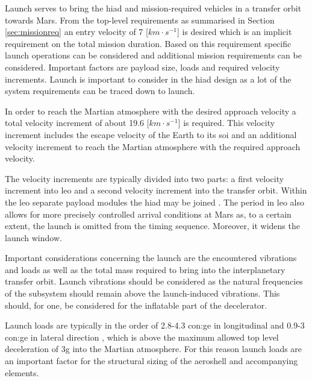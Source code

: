 Launch serves to bring the \gls{hiad} and mission-required vehicles in a transfer orbit towards Mars. From the top-level requirements as summarised in Section \ref{sec:missionreq} an entry velocity of 7 [$km\cdot s^{-1}$] is desired which is an implicit requirement on the total mission duration.
Based on this requirement specific launch operations can be considered and additional mission requirements can be considered. Important factors are payload size, loads and required velocity increments. Launch is important to consider in the \gls{hiad} design as a lot of the system requirements can be traced down to launch.

In order to reach the Martian atmosphere with the desired approach velocity a total velocity increment of about 19.6 [$km\cdot s^{-1}$] is required. This velocity increment includes the escape velocity of the Earth to its \gls{soi} and an additional velocity increment to reach the Martian atmosphere with the required approach velocity.

The velocity increments are typically divided into two parts: a first velocity increment into \gls{leo} and a second velocity increment into the transfer orbit. Within the \gls{leo} separate payload modules the \gls{hiad} may be joined \cite{George2009}. The period in \gls{leo} also allows for more precisely controlled arrival conditions at Mars as, to a certain extent, the launch is omitted from the timing sequence. Moreover, it widens the launch window.


Important considerations concerning the launch are the encountered vibrations and loads as well as the total mass required to bring into the interplanetary transfer orbit. Launch vibrations should be considered as the natural frequencies of the subsystem should remain above the launch-induced vibrations. This should, for one, be considered for the inflatable part of the decelerator.

Launch loads are typically in the order of 2.8-4.3 \gls{con:ge} in longitudinal and 0.9-3 \gls{con:ge} in lateral direction \cite{Wertz2011}, which is above the maximum allowed top level deceleration of 3g into the Martian atmosphere. For this reason launch loads are an important factor for the structural sizing of the aeroshell and accompanying elements. 

